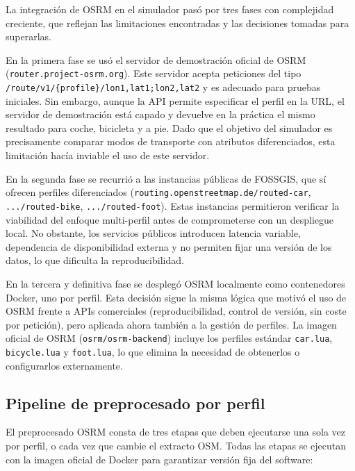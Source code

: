 La integración de OSRM en el simulador pasó por tres fases con complejidad creciente, que reflejan las limitaciones encontradas y las decisiones tomadas para superarlas.

En la primera fase se usó el servidor de demostración oficial de OSRM (\texttt{router.project-osrm.org}). Este servidor acepta peticiones del tipo \texttt{/route/v1/\{profile\}/lon1,lat1;lon2,lat2} y es adecuado para pruebas iniciales. Sin embargo, aunque la API permite especificar el perfil en la URL, el servidor de demostración está capado y devuelve en la práctica el mismo resultado para coche, bicicleta y a pie. Dado que el objetivo del simulador es precisamente comparar modos de transporte con atributos diferenciados, esta limitación hacía inviable el uso de este servidor.

En la segunda fase se recurrió a las instancias públicas de FOSSGIS, que sí ofrecen perfiles diferenciados (\texttt{routing.openstreetmap.de/routed-car}, \texttt{.../routed-bike}, \texttt{.../routed-foot}). Estas instancias permitieron verificar la viabilidad del enfoque multi-perfil antes de comprometerse con un despliegue local. No obstante, los servicios públicos introducen latencia variable, dependencia de disponibilidad externa y no permiten fijar una versión de los datos, lo que dificulta la reproducibilidad.

En la tercera y definitiva fase se desplegó OSRM localmente como contenedores Docker, uno por perfil. Esta decisión sigue la misma lógica que motivó el uso de OSRM frente a APIs comerciales (reproducibilidad, control de versión, sin coste por petición), pero aplicada ahora también a la gestión de perfiles. La imagen oficial de OSRM (\texttt{osrm/osrm-backend}) incluye los perfiles estándar \texttt{car.lua}, \texttt{bicycle.lua} y \texttt{foot.lua}, lo que elimina la necesidad de obtenerlos o configurarlos externamente.

\subsection{Pipeline de preprocesado por perfil}

El preprocesado OSRM consta de tres etapas que deben ejecutarse una sola vez por perfil, o cada vez que cambie el extracto OSM. Todas las etapas se ejecutan con la imagen oficial de Docker para garantizar versión fija del software:

